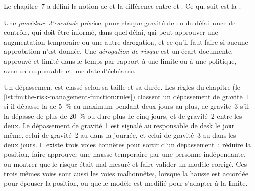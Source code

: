 Le chapitre~7 a défini la notion de  et la différence entre  et . Ce qui suit est la .

\begin{definition}\label{def:fm:the-risk-management-function:escalation}
Une \emph{procédure d'escalade} précise, pour chaque gravité de  ou de défaillance de contrôle, qui doit être informé, dans
quel délai, qui peut approuver une augmentation temporaire ou une autre dérogation, et ce qu'il faut faire si aucune approbation n'est donnée. Une
\emph{dérogation de risque} est un écart documenté, approuvé et limité dans le temps par rapport à une limite ou à une politique, avec un responsable et une date d'échéance.
\end{definition}

Un dépassement est classé selon sa taille et sa durée. Les règles du chapitre (le \cref{lst:fm:the-risk-management-function:rules}) classent un dépassement de gravité~1 si
il dépasse la  de 5~\% au maximum pendant deux jours au plus, de gravité~3 s'il la dépasse de plus de 20~\% ou dure plus de cinq jours, et de
gravité~2 entre les deux. Le dépassement de gravité~1 est signalé au responsable de desk le jour même, celui de gravité~2 au  dans la journée, et celui de gravité~3 au
 dans les deux jours. Il existe trois voies honnêtes pour sortir d'un dépassement~: réduire la position, faire approuver une hausse temporaire par
une personne indépendante, ou montrer que le risque était mal mesuré et faire valider un modèle corrigé. Ces trois mêmes voies sont aussi les voies malhonnêtes, lorsque la
hausse est accordée pour épouser la position, ou que le modèle est modifié pour s'adapter à la limite.

\label{lst:fm:the-risk-management-function:rules}

